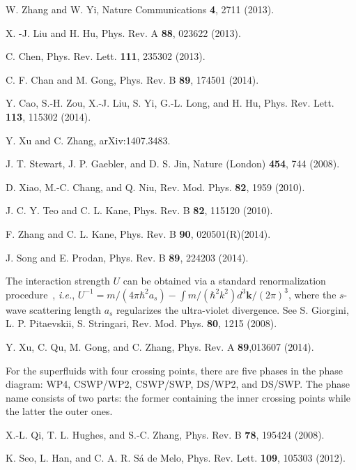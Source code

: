 \documentclass[prl,aps,twocolumn,showpacs,floatfix]{revtex4}
\begin{document}
\begin{thebibliography}{99}
 {W. Zhang and W. Yi, Nature Communications \textbf{4},
2711 (2013).}

 {X. -J. Liu and H. Hu, Phys. Rev. A \textbf{88}, 023622
(2013).}

 {C. Chen, Phys. Rev. Lett. \textbf{111}, 235302 (2013).%
}

 {C. F. Chan and M. Gong, Phys. Rev. B \textbf{89},
174501 (2014).}

 {Y. Cao, S.-H. Zou, X.-J. Liu, S. Yi, G.-L. Long,
and H. Hu, Phys. Rev. Lett. \textbf{113}, 115302 (2014).}

 {Y. Xu and C. Zhang, arXiv:1407.3483.}

 {J. T. Stewart, J. P. Gaebler, and D. S. Jin, Nature
(London) \textbf{454}, 744 (2008).}

 {D. Xiao, M.-C. Chang, and Q. Niu, Rev. Mod. Phys. \textbf{%
82}, 1959 (2010).}

 {J. C. Y. Teo and C. L. Kane, Phys. Rev. B \textbf{82},
115120 (2010).}

 {F. Zhang and C. L. Kane, Phys. Rev. B \textbf{90},
020501(R)(2014).}

 {J. Song and E. Prodan, Phys. Rev. B \textbf{89},
224203 (2014).}

 The interaction strength $U$ can be obtained via a
standard renormalization procedure~, \textit{i.e.}, $U^{-1}={m}/(4\pi \hbar
^{2}a_{s})-\int {m}/(\hbar ^{2}k^{2}){d^{3}{\bm k}}/{(2\pi )^{3}}$, where
the $s$-wave scattering length $a_{s}$ regularizes the ultra-violet
divergence. See {S. Giorgini, L. P. Pitaevskii, S. Stringari, Rev. Mod.
Phys. \textbf{80}, 1215 (2008).}

 {Y. Xu, C. Qu, M. Gong, and C. Zhang, Phys. Rev. A
\textbf{89},013607 (2014).}

 {For the superfluids with four crossing points, there
are five phases in the phase diagram: WP4, CSWP/WP2, CSWP/SWP, DS/WP2, and
DS/SWP. The phase name consists of two parts: the former containing the
inner crossing points while the latter the outer ones. }

 {X.-L. Qi, T. L. Hughes, and S.-C. Zhang, Phys. Rev. B
\textbf{78}, 195424 (2008).}

 {K. Seo, L. Han, and C. A. R. S\'a de Melo, Phys. Rev.
Lett. \textbf{109}, 105303 (2012).}


\end{thebibliography}
\end{document}
